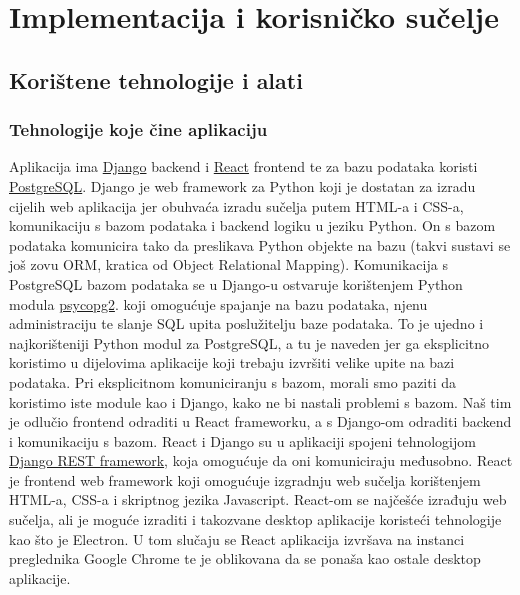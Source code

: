 \chapter{Implementacija i korisničko sučelje}
		
		
		\section{Korištene tehnologije i alati}
		
			
			 \subsection{Tehnologije koje čine aplikaciju}
			 	Aplikacija ima  \href{https://www.djangoproject.com/}{Django} backend i \href{https://react.dev/}{React} frontend te za bazu podataka koristi \href{https://www.postgresql.org/}{PostgreSQL}. Django je web framework za Python koji je dostatan za izradu cijelih web aplikacija jer obuhvaća izradu sučelja putem HTML-a i CSS-a, komunikaciju s bazom podataka i backend logiku u jeziku Python. On s bazom podataka komunicira tako da preslikava Python objekte na bazu (takvi sustavi se još zovu ORM, kratica od Object Relational Mapping). Komunikacija s PostgreSQL bazom podataka se u Django-u ostvaruje korištenjem Python modula \href{https://pypi.org/project/psycopg2/}{psycopg2}. koji omogućuje spajanje na bazu podataka, njenu administraciju te slanje SQL upita poslužitelju baze podataka. To je ujedno i najkorišteniji Python modul za PostgreSQL, a tu je naveden jer ga eksplicitno koristimo u dijelovima aplikacije koji trebaju izvršiti velike upite na bazi podataka. Pri eksplicitnom komuniciranju s bazom, morali smo paziti da koristimo iste module kao i Django, kako ne bi nastali problemi s bazom. Naš tim je odlučio frontend odraditi u React frameworku, a s Django-om odraditi backend i komunikaciju s bazom. React i Django su u aplikaciji spojeni tehnologijom \href{https://www.django-rest-framework.org/}{Django REST framework}, koja omogućuje da oni komuniciraju međusobno. React je frontend web framework koji omogućuje izgradnju web sučelja korištenjem HTML-a, CSS-a i skriptnog jezika Javascript. React-om se najčešće izrađuju web sučelja, ali je moguće izraditi i takozvane desktop aplikacije koristeći tehnologije kao što je Electron. U tom slučaju se React aplikacija izvršava na instanci preglednika Google Chrome te je oblikovana da se ponaša kao ostale desktop aplikacije.
			
